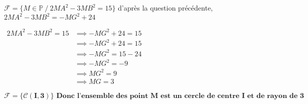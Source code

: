 \documentclass[12pt,a4paper]{article}
\begin{document}
\begin{enumerate}
\begin{enumerate}
                    \( \mathcal{F} = \{ M \in \mathbb{P} \ / \ 2MA^2 - 3MB^2 = 15 \} \) d'après la question précédente, \( 2MA^2 - 3MB^2 = -MG^2 + 24 \)

                    \(
                    \begin{aligned}
                        2MA^2 - 3MB^2 = 15 & \implies -MG^2 + 24 = 15 \\
                                           & \implies -MG^2 + 24 = 15 \\
                                           & \implies -MG^2 = 15 -24  \\
                                           & \implies -MG^2 = -9      \\
                                           & \implies MG^2 = 9        \\
                                           & \implies MG = 3
                    \end{aligned}
                    \)

                    \begin{resultbox}
                        \[
                            \mathbf{\mathcal{F} = \{ \mathcal{C} (I,3)\}\text{   Donc l'ensemble des point \(M\) est un cercle de centre \(I\) et de rayon de 3 }}
                        \]
                    \end{resultbox}
          \end{enumerate}
\end{enumerate}
\end{document}
